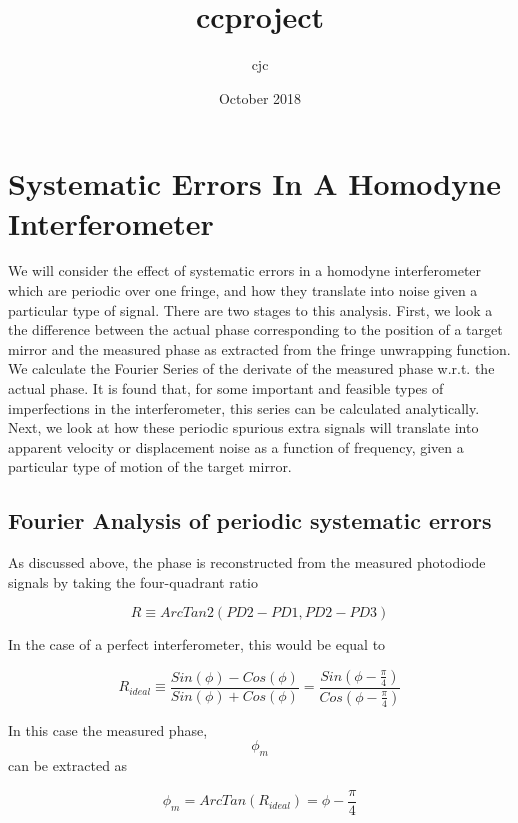 \documentclass{article}
\title{ccproject}
\author{cjc }
\date{October 2018}
\begin{document}
\maketitle

\section{Systematic Errors In A Homodyne Interferometer}

We will consider the effect of systematic errors in a homodyne interferometer
which are periodic over one fringe, and how they translate into noise
given a particular type of signal. There are two stages to this analysis.
First, we look a the difference between the actual phase corresponding
to the position of a target mirror and the measured phase as extracted
from the fringe unwrapping function. We calculate the Fourier Series
of the derivate of the measured phase w.r.t. the actual phase. It
is found that, for some important and feasible types of imperfections
in the interferometer, this series can be calculated analytically.
Next, we look at how these periodic spurious extra signals will translate
into apparent velocity or displacement noise as a function of frequency,
given a particular type of motion of the target mirror.

\subsection{Fourier Analysis of periodic systematic errors}

As discussed above, the phase is reconstructed from the measured photodiode
signals by taking the four-quadrant ratio

\begin{equation}
R\equiv ArcTan2\left(PD2-PD1,PD2-PD3\right)
\end{equation}


In the case of a perfect interferometer, this would be equal to

\begin{equation}
R_{ideal}\equiv\frac{Sin\left(\phi\right)-Cos\left(\phi\right)}{Sin\left(\phi\right)+Cos\left(\phi\right)}=\frac{Sin\left(\phi-\frac{\pi}{4}\right)}{Cos\left(\phi-\frac{\pi}{4}\right)}
\end{equation}


In this case the measured phase, $$\phi_{m}$$ can be extracted as

\begin{equation}
\phi_{m}=ArcTan\left(R_{ideal}\right)=\phi-\frac{\pi}{4}
\end{equation}
\end{document}
